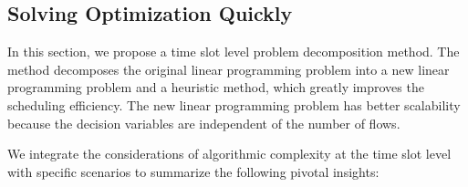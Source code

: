 
\subsection{Solving Optimization Quickly} \label{Solving Optimization Quickly}

In this section, we propose a time slot level problem decomposition method. The method decomposes the original linear programming problem into a new linear programming problem and a heuristic method, which greatly improves the scheduling efficiency. The new linear programming problem has better scalability because the decision variables are independent of the number of flows.



 We integrate the considerations of algorithmic complexity at the time slot level with specific scenarios to summarize the following pivotal insights:

